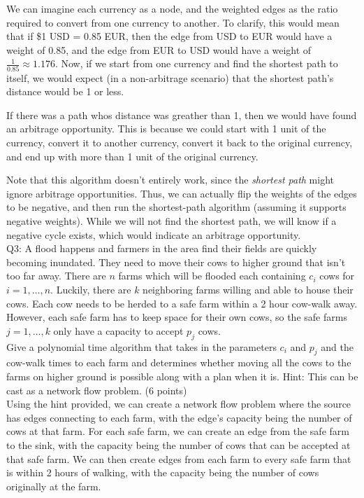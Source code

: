\documentclass[a4paper,12pt]{article}
\begin{document}
We can imagine each currency as a node, and the weighted edges as the ratio
required to convert from one currency to another. To clarify, this would
mean that if \$1 USD = 0.85 EUR, then the edge from USD to EUR would have a
weight of 0.85, and the edge from EUR to USD would have a weight of
\(\frac{1}{0.85} \approx 1.176\). Now, if we start from one currency and find
the shortest path to itself, we would expect (in a non-arbitrage scenario) that
the shortest path's distance would be 1 or less.

If there was a path whos distance was greather than 1, then we would have found
an arbitrage opportunity. This is because we could start with 1 unit of the
currency, convert it to another currency, convert it back to the original
currency, and end up with more than 1 unit of the original currency.

Note that this algorithm doesn't entirely work, since the \emph{shortest path}
might ignore arbitrage opportunities. Thus, we can actually flip the weights of
the edges to be negative, and then run the shortest-path algorithm (assuming it
supports negative weights). While we will not find the shortest path, we will
know if a negative cycle exists, which would indicate an arbitrage opportunity. \\

Q3: A flood happens and farmers in the area find their fields are quickly
becoming inundated. They need to move their cows to higher ground that isn't too
far away. There are $n$ farms which will be flooded each containing $c_i$ cows
for $i = 1, \ldots, n$. Luckily, there are $k$ neighboring farms willing and
able to house their cows. Each cow needs to be herded to a safe farm within a 2
hour cow-walk away. However, each safe farm has to keep space for their own
cows, so the safe farms $j=1, \ldots, k$ only have a capacity to accept $p_j$
cows. \\
Give a polynomial time algorithm that takes in the parameters $c_i$ and $p_j$
and the cow-walk times to each farm and determines whether moving all the cows
to the farms on higher ground is possible along with a plan when it is. Hint:
This can be cast as a network flow problem. (6 points) \\

Using the hint provided, we can create a network flow problem where the source
has edges connecting to each farm, with the edge's capacity being the number of
cows at that farm. For each safe farm, we can create an edge from the safe farm
to the sink, with the capacity being the number of cows that can be accepted at
that safe farm. We can then create edges from each farm to every safe farm that
is within 2 hours of walking, with the capacity being the number of cows originally
at the farm.
\end{document}
